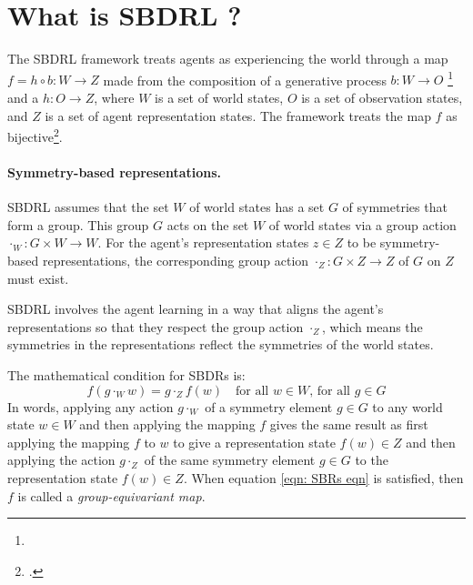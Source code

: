 \section{What is SBDRL ?}

The SBDRL framework treats agents as experiencing the world through a map $f = h \circ b: W \to Z$ made from the composition of a generative process $b: W \to O$ 
\footnote{
} and a $h: O \to Z$, where $W$ is a set of world states, $O$ is a set of observation states, and $Z$ is a set of agent representation states.
The framework treats the map $f$ as bijective\footnote{.}.

\paragraph{Symmetry-based representations.}
SBDRL assumes that the set $W$ of world states has a set $G$ of symmetries that form a group.
This group $G$ acts on the set $W$ of world states via a group action $\cdot_{W}: G \times W \to W$.
For the agent's representation states $z \in Z$ to be symmetry-based representations, the corresponding group action $\cdot_{Z}: G \times Z \to Z$ of $G$ on $Z$ must exist.

SBDRL involves the agent learning in a way that aligns the agent's representations so that they respect the group action $\cdot_{Z}$, which means the symmetries in the representations reflect the symmetries of the world states.

The mathematical condition for SBDRs is:
\begin{equation}\label{eqn: SBRs eqn}
	f(g \cdot_{W} w) = g \cdot_{Z} f(w) \quad \text{for all $w\in W$, for all $g \in G$}
\end{equation}
In words, applying any action $g \cdot_{W}$ of a symmetry element $g \in G$ to any world state $w \in W$ and then applying the mapping $f$ gives the same result as first applying the mapping $f$ to $w$ to give a representation state $f(w) \in Z$ and then applying the action $g \cdot_Z$ of the same symmetry element $g \in G$ to the representation state $f(w) \in Z$.
When equation \ref{eqn: SBRs eqn} is satisfied, then $f$ is called a \emph{group-equivariant map}.

